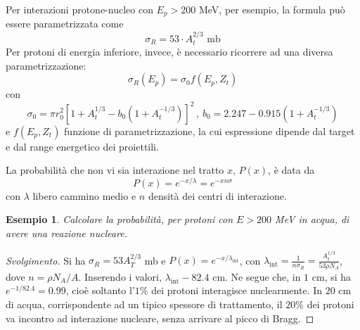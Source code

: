 \documentclass[11pt, a4paper]{scrartcl}
\newenvironment{svolgimento}{\renewcommand\qedsymbol{$\blacksquare$}\begin{proof}[Svolgimento]}{\end{proof}}
\theoremstyle{style}
\newtheorem{esempio}{Esempio}[section]
\theoremstyle{style1}
\numberwithin{equation}{subsection}
\begin{document}
Per interazioni protone-nucleo con $E_p > 200$ MeV, per esempio, la formula pu\`o essere parametrizzata come
\begin{equation}
	\sigma _R = 53 \cdot A_t ^{2 / 3} \text{ mb}
\end{equation}
Per protoni di energia inferiore, invece, \`e necessario ricorrere ad una diversa parametrizzazione:
\begin{equation}
	\sigma _R (E_p) = \sigma _0 f(E_p,Z_t)
\end{equation}
con 
\[
\sigma _0 = \pi r_0^2 \left[ 1  + A_t ^{1 / 3} - b_0 \left(1 + A_t ^{-1 / 3}\right)  \right] ^2 \, , \ b_0 = 2.247 - 0.915 \left(1 + A_t ^{-1 / 3}\right) 
\] 
e $f(E_p,Z_t)$ funzione di parametrizzazione, la cui espressione dipende dal target e dal range energetico dei proiettili.

La probabilit\`a che non vi sia interazione nel tratto $x$, $P(x)$, \`e data da 
\begin{equation}
	P(x) = e^{- x / \lambda } = e^{-x n\sigma }
\end{equation}
con $\lambda $ libero cammino medio e $n$ densit\`a dei centri di interazione.
\begin{esempio}
Calcolare la probabilit\`a, per protoni con $E>200$ MeV in acqua, di avere una reazione nucleare.
\end{esempio}
\begin{svolgimento}
Si ha $\sigma _R = 53A_T^{2 / 3}$ mb e $P(x) = e^{-x / \lambda _\text{int}}$, con $\lambda _\text{int} = \frac{1}{n\sigma _R} = \frac{A_t ^{1 / 3}}{53 \rho  N_A}$, dove $n = \rho  N_A / A$.
Inserendo i valori, $\lambda _\text{int} - 82.4$ cm.
Ne segue che, in $1$ cm, si ha $e^{-1 / 82.4} = 0.99$, cio\`e soltanto l'$1\%$ dei protoni interagisce nuclearmente.
In $20$ cm di acqua, corrispondente ad un tipico spessore di trattamento, il $20\%$ dei protoni va incontro ad interazione nucleare, senza arrivare al picco di Bragg.
\end{svolgimento}
\end{document}
